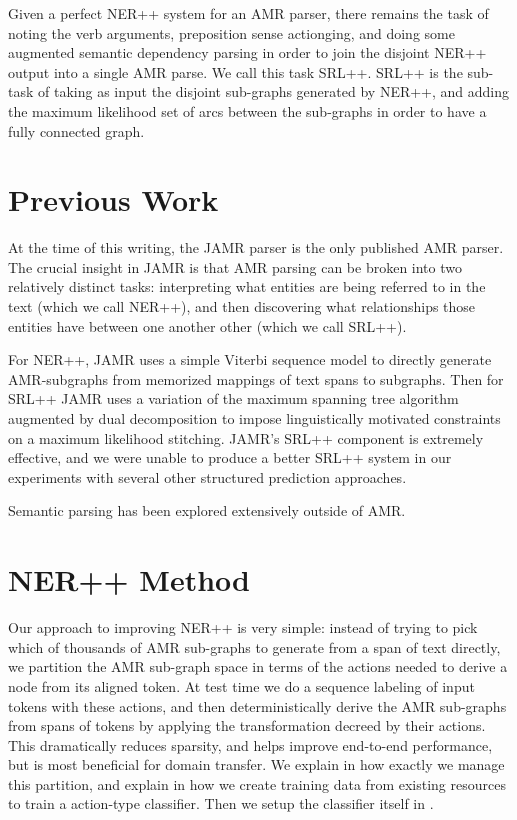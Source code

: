 \documentclass[11pt]{article}
\begin{document}

Given a perfect NER++ system for an AMR parser, there remains the task of noting the verb arguments, preposition sense actionging, and doing some augmented semantic dependency parsing in order to join the disjoint NER++ output into a single AMR parse. We call this task SRL++. SRL++ is the sub-task of taking as input the disjoint sub-graphs generated by NER++, and adding the maximum likelihood set of arcs between the sub-graphs in order to have a fully connected graph.

\section{Previous Work}

At the time of this writing, the JAMR parser \cite{Flanigan:14} is the only published AMR parser.
The crucial insight in JAMR is that AMR parsing can be broken into two relatively distinct tasks: interpreting what entities are being referred to in the text (which we call NER++), and then discovering what relationships those entities have between one another other (which we call SRL++).

For NER++, JAMR uses a simple Viterbi sequence model to directly generate AMR-subgraphs from memorized mappings of text spans to subgraphs. Then for SRL++ JAMR uses a variation of the maximum spanning tree algorithm augmented by dual decomposition to impose linguistically motivated constraints on a maximum likelihood stitching. JAMR's SRL++ component is extremely effective, and we were unable to produce a better SRL++ system in our experiments with several other structured prediction approaches.

Semantic parsing has been explored extensively outside of AMR. 

\section{NER++ Method}

Our approach to improving NER++ is very simple: instead of trying to pick which of thousands of AMR sub-graphs to generate from a span of text directly, we partition the AMR sub-graph space in terms of the actions needed to derive a node from its aligned token. At test time we do a sequence labeling of input tokens with these actions, and then deterministically derive the AMR sub-graphs from spans of tokens by applying the transformation decreed by their actions. This dramatically reduces sparsity, and helps improve end-to-end performance, but is most beneficial for domain transfer. We explain in  how exactly we manage this partition, and explain in  how we create training data from existing resources to train a action-type classifier. Then we setup the classifier itself in .
\end{document}
